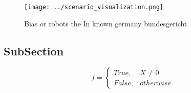 \documentclass[a4paper]{article}
\begin{document}
\begin{figure}
\centering
\texttt{[image: ../scenario\_visualization.png]}
\caption{Bias or robots the In known germany bundesgericht
}
\end{figure}
 
\subsection{SubSection}

\begin{equation}   f =
\begin{cases} True, & X \neq 0\\
False, & otherwise
\end{cases}
\end{equation}
\end{document}
